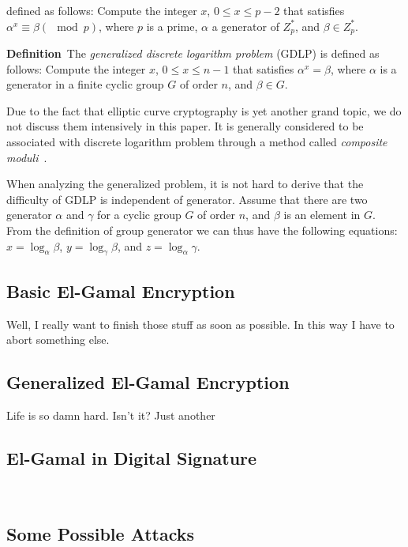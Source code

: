 \documentclass[12pt,journal,compsoc]{IEEEtran}
\begin{document}
defined as follows: Compute the integer $x$, $0\leq x\leq p-2$ that
satisfies $\alpha^{x}\equiv \beta(\mod p)$, where $p$ is a prime,
$\alpha$ a generator of $Z^{*}_{p}$, and $\beta\in Z^{*}_{p}$.
\par
\textbf{Definition}~The \emph{generalized discrete logarithm problem}
(GDLP) is defined as follows: Compute the integer $x$, $0\leq x\leq
n-1$ that satisfies $\alpha^{x}=\beta$, where $\alpha$ is a generator
in a finite cyclic group $G$ of order $n$, and $\beta\in G$.
\par
Due to the fact that elliptic curve cryptography is yet another grand
topic, we do not discuss them intensively in this paper. It is
generally considered to be associated with discrete logarithm problem
through a method called \emph{composite
  moduli}~\cite{ref:menezes2010handbook}. 
\par
When analyzing the generalized problem, it is not hard to derive that
the difficulty of GDLP is independent of generator. Assume that there
are two generator $\alpha$ and $\gamma$ for a cyclic group $G$ of
order $n$, and $\beta$ is an element in $G$. From the definition of
group generator we can thus have the following equations:
$x=\log_{\alpha}\beta$, $y=\log_{\gamma}\beta$, and
$z=\log_{\alpha}\gamma$. 




\subsection{Basic El-Gamal Encryption}
Well, I really want to finish those stuff as soon as possible. In this
way I have to abort something else.

\subsection{Generalized El-Gamal Encryption}
Life is so damn hard. Isn't it? Just another 

\subsection{El-Gamal in Digital Signature}
~

\subsection{Some Possible Attacks}
~
\end{document}
